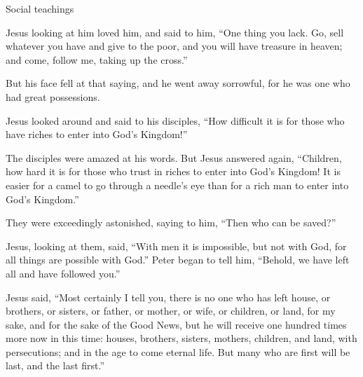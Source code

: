 \documentclass[10pt,twoside]{book}
\begin{document}
\begin{section}{Social teachings}
{  Jesus looking at him loved him, and said to him, ``One thing you lack. Go, sell whatever you have and give to the poor, and you will have treasure in heaven; and come, follow me, taking up the cross.''

  But his face fell at that saying, and he went away sorrowful, for he was one who had great possessions.

  Jesus looked around and said to his disciples, ``How difficult it is for those who have riches to enter into God's Kingdom!''

  The disciples were amazed at his words. But Jesus answered again, ``Children, how hard it is for those who trust in riches to enter into God's Kingdom!    It is easier for a camel to go through a needle's eye than for a rich man to enter into God's Kingdom.''

  They were exceedingly astonished, saying to him, ``Then who can be saved?''

  Jesus, looking at them, said, ``With men it is impossible, but not with God, for all things are possible with God.'' 
 Peter began to tell him, ``Behold, we have left all and have followed you.''

  Jesus said, ``Most certainly I tell you, there is no one who has left house, or brothers, or sisters, or father, or mother, or wife, or children, or land, for my sake, and for the sake of the Good News,    but he will receive one hundred times more now in this time: houses, brothers, sisters, mothers, children, and land, with persecutions; and in the age to come eternal life.    But many who are first will be last, and the last first.'' }

\end{section}
\end{document}
